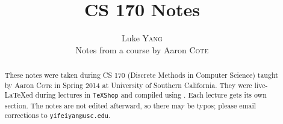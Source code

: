 \title{\large CS 170 Notes}
\setcounter{tocdepth}{1}
\author{Luke \textsc{Yang} \\ Notes from a course by Aaron \textsc{Cote}}

\begin{abstract}
These notes were taken during CS 170 (Discrete Methods in Computer Science) taught
by Aaron \textsc{Cote} in
Spring 2014 at University of Southern California.
They were
live-\LaTeX\-ed during lectures in \texttt{TeXShop} and compiled using
\XeLaTeX. Each lecture gets its own section. The notes are not edited
afterward, so there may be typos; please email corrections to
\texttt{yifeiyan@usc.edu}.
\end{abstract}

\maketitle
